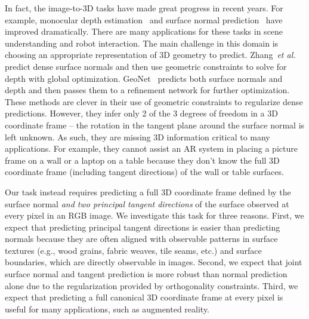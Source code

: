 In fact, the image-to-3D tasks have made great progress in recent years.  For example, monocular depth estimation~\cite{shelhamer2015scene,li2017two,xu2017multi,wang2018adaptive,fu2018deep} and surface normal prediction~\cite{eigen2015predicting,wang2015designing,bansal2016marr,qi2018geonet} have improved dramatically.  There are many applications for these tasks in scene understanding and robot interaction.
%
The main challenge in this domain is choosing an appropriate representation of 3D geometry to predict.  Zhang~\textit{et al.}~\cite{zhang2018deep} predict dense surface normals and then use geometric constraints to solve for depth with global optimization.  GeoNet~\cite{qi2018geonet} predicts both surface normals and depth and then passes them to a refinement network for further optimization.  These methods are clever in their use of geometric constraints to regularize dense predictions.   However, they infer only 2 of the 3 degrees of freedom in a 3D coordinate frame -- the rotation in the tangent plane around the surface normal is left unknown.  As such, they are missing 3D information critical to many applications.   For example, they cannot assist an AR system in placing a picture frame on a wall or a laptop on a table because they don't know the full 3D coordinate frame (including tangent directions) of the wall or table surfaces.

Our task instead requires predicting a full 3D coordinate frame defined by the surface normal {\em and two principal tangent directions} of the surface observed at every pixel in an RGB image.  We investigate this task for three reasons.   First, we expect that predicting principal tangent directions is easier than predicting normals because they are often aligned with observable patterns in surface textures (e.g., wood grains, fabric weaves, tile seams, etc.) and surface boundaries, which are directly observable in images.  Second, we expect that joint surface normal and tangent prediction is more robust than normal prediction alone due to the regularization provided by orthogonality constraints.  Third, we expect that predicting a full canonical 3D coordinate frame at every pixel is useful for many applications, such as augmented reality.



